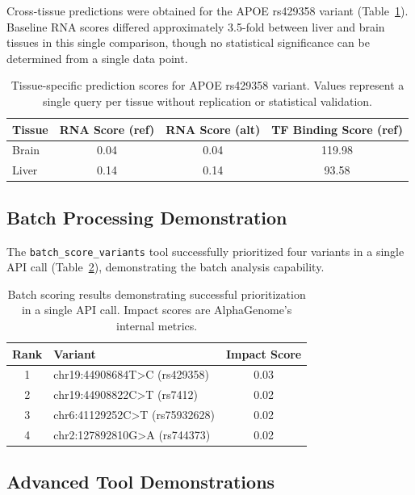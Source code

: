 \documentclass[11pt]{article}
\begin{document}
Cross-tissue predictions were obtained for the APOE rs429358 variant (Table~\ref{tab:tissue}). Baseline RNA scores differed approximately 3.5-fold between liver and brain tissues in this single comparison, though no statistical significance can be determined from a single data point.

\begin{table}[h]
\centering
\begin{tabular}{lccc}
\toprule
\textbf{Tissue} & \textbf{RNA Score (ref)} & \textbf{RNA Score (alt)} & \textbf{TF Binding Score (ref)} \\
\midrule
Brain & 0.04 & 0.04 & 119.98 \\
Liver & 0.14 & 0.14 & 93.58 \\
\bottomrule
\end{tabular}
\caption{Tissue-specific prediction scores for APOE rs429358 variant. Values represent a single query per tissue without replication or statistical validation.}
\label{tab:tissue}
\end{table}

\subsection{Batch Processing Demonstration}

The \texttt{batch\_score\_variants} tool successfully prioritized four variants in a single API call (Table~\ref{tab:batch}), demonstrating the batch analysis capability.

\begin{table}[h]
\centering
\begin{tabular}{clc}
\toprule
\textbf{Rank} & \textbf{Variant} & \textbf{Impact Score} \\
\midrule
1 & chr19:44908684T>C (rs429358) & 0.03 \\
2 & chr19:44908822C>T (rs7412) & 0.02 \\
3 & chr6:41129252C>T (rs75932628) & 0.02 \\
4 & chr2:127892810G>A (rs744373) & 0.02 \\
\bottomrule
\end{tabular}
\caption{Batch scoring results demonstrating successful prioritization in a single API call. Impact scores are AlphaGenome's internal metrics.}
\label{tab:batch}
\end{table}

\subsection{Advanced Tool Demonstrations}
\end{document}

